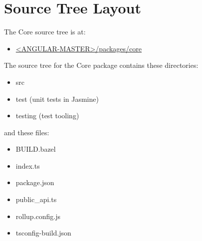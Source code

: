 \section{Source Tree Layout}

The Core source tree is at:

\begin{itemize}
  \item \href{https://github.com/angular/angular/tree/master/packages/core}
        {<ANGULAR-MASTER>/packages/core}
\end{itemize}

The source tree for the Core package contains these directories:

\begin{itemize}
  \item src
  \item test (unit tests in Jasmine)
  \item testing (test tooling)
\end{itemize}

and these files:

\begin{itemize}
  \item BUILD.bazel
  \item index.ts
  \item package.json
  \item public\_api.ts
  \item rollup.config.js
  \item tsconfig-build.json
\end{itemize}
